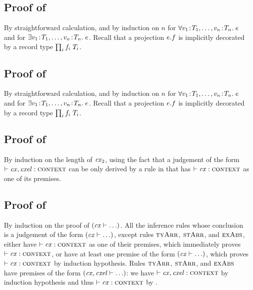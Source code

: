 \subsection*{Proof of }

By straightforward calculation, and by induction on $n$ for
$\forall v_1\!:\!T_1,\ldots,v_n\!:\!T_n.\;e$ and for
$\exists v_1\!:\!T_1,\ldots,v_n\!:\!T_n.\;e$. Recall that
a projection $e.f$ is implicitly decorated by a record type $\prod_{i}f_i\;T_i$.



\subsection*{Proof of }

By straightforward calculation, and by induction on $n$ for
$\forall v_1\!:\!T_1,\ldots,v_n\!:\!T_n.\;e$ and for
$\exists v_1\!:\!T_1,\ldots,v_n\!:\!T_n.\;e$. Recall that
a projection $e.f$ is implicitly decorated by a record type $\prod_{i}f_i\;T_i$.



\subsection*{Proof of }

By induction on the length of $\mathit{cx}_2$, using the fact that a judgement of the
form $\vdash\mathit{cx},\mathit{cxel}:\textsc{context}$ can be only derived by a rule in
 that has $\vdash\mathit{cx}:\textsc{context}$ as one of its premises.



\subsection*{Proof of }

By induction on the proof of $(\mathit{cx}\vdash\ldots)$. All the inference rules whose
conclusion is a judgement of the form $(\mathit{cx}\vdash\ldots)$, except rules
$\textsc{tyArr}$, $\textsc{stArr}$, and $\textsc{exAbs}$, either have $\vdash\mathit{cx}:\textsc{context}$ as one of their
premises, which immediately proves $\vdash\mathit{cx}:\textsc{context}$, or have at least one premise of
the form $(\mathit{cx}\vdash\ldots)$, which proves $\vdash\mathit{cx}:\textsc{context}$ by induction
hypothesis. Rules $\textsc{tyArr}$, $\textsc{stArr}$, and $\textsc{exAbs}$ have premises of the form
$(\mathit{cx},\mathit{cxel}\vdash\ldots)$: we have $\vdash\mathit{cx},\mathit{cxel}:\textsc{context}$ by
induction hypothesis and thus $\vdash\mathit{cx}:\textsc{context}$ by .



